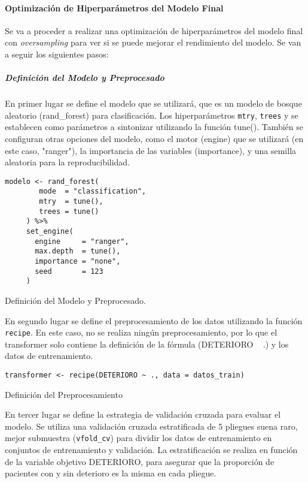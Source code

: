 \paragraph{Optimización de Hiperparámetros del Modelo Final}

Se va a proceder a realizar una optimización de hiperparámetros del modelo final con \textit{oversampling} para ver si se puede mejorar el rendimiento del modelo. Se van a seguir los siguientes pasos:

\subparagraph{Definición del Modelo y Preprocesado}

En primer lugar se define el modelo que se utilizará, que es un modelo de bosque aleatorio (rand\_forest) para clasificación. Los hiperparámetros \texttt{mtry}, \texttt{trees} y  se establecen como parámetros a sintonizar utilizando la función tune(). También se configuran otras opciones del modelo, como el motor (engine) que se utilizará (en este caso, "ranger"), la importancia de las variables (importance), y una semilla aleatoria para la reproducibilidad.

\begin{code}[H]
\begin{lstlisting}[style=mystyle]
    modelo <- rand_forest(
        mode  = "classification",
        mtry  = tune(),
        trees = tune()
     ) %>%
     set_engine(
       engine     = "ranger",
       max.depth  = tune(),
       importance = "none",
       seed       = 123
     )
\end{lstlisting}
\caption{Definición del Modelo y Preprocesado.}
\label{code:Definición del Modelo y Preprocesado}
\end{code}

En segundo lugar se define el preprocesamiento de los datos utilizando la función \texttt{recipe}. En este caso, no se realiza ningún preprocesamiento, por lo que el transformer solo contiene la definición de la fórmula (DETERIORO ~ .) y los datos de entrenamiento.

\begin{code}[H]
\begin{lstlisting}[style=mystyle]
    transformer <- recipe(DETERIORO ~ ., data = datos_train)
\end{lstlisting}
\caption{Definición del Preprocesamiento}
\label{code:Definición del Preprocesamiento}
\end{code}

En tercer lugar se define la estrategia de validación cruzada para evaluar el modelo. Se utiliza una validación cruzada estratificada de 5 {\color{red}pliegues suena raro, mejor submuestra} (\texttt{vfold\_cv}) para dividir los datos de entrenamiento en conjuntos de entrenamiento y validación. La estratificación se realiza en función de la variable objetivo DETERIORO, para asegurar que la proporción de pacientes con y sin deterioro es la misma en cada pliegue.

